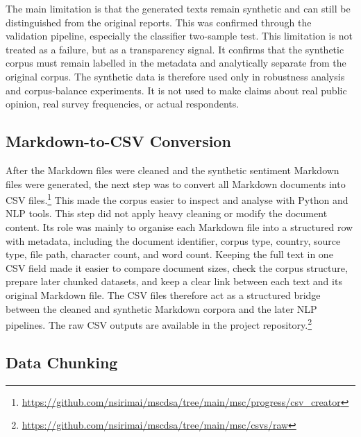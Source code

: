 \documentclass{article}
\begin{document}
The main limitation is that the generated texts remain synthetic and can still be
distinguished from the original reports. This was confirmed through the validation
pipeline, especially the classifier two-sample test. This limitation is not treated
as a failure, but as a transparency signal. It confirms that the synthetic corpus
must remain labelled in the metadata and analytically separate from the original
corpus. The synthetic data is therefore used only in robustness analysis and
corpus-balance experiments. It is not used to make claims about real public opinion,
real survey frequencies, or actual respondents.



\subsection{Markdown-to-CSV Conversion}


After the Markdown files were cleaned and the synthetic sentiment Markdown files were
generated, the next step was to convert all Markdown documents into CSV
files.\footnote{\url{https://github.com/nsirimai/mscdsa/tree/main/msc/progress/csv_creator}}
This made the corpus easier to inspect and analyse with Python and NLP tools. This
step did not apply heavy cleaning or modify the document content. Its role was mainly
to organise each Markdown file into a structured row with metadata, including the
document identifier, corpus type, country, source type, file path, character count,
and word count. Keeping the full text in one CSV field made it easier to compare
document sizes, check the corpus structure, prepare later chunked datasets, and keep
a clear link between each text and its original Markdown file. The CSV files
therefore act as a structured bridge between the cleaned and synthetic Markdown
corpora and the later NLP pipelines. The raw CSV outputs are available in the project
repository.\footnote{\url{https://github.com/nsirimai/mscdsa/tree/main/msc/csvs/raw}}


\subsection{Data Chunking}
\end{document}
